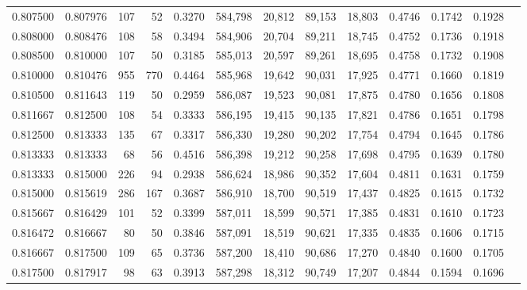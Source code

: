 \begin{tabular}{rrrrrrrrrrrrr}
0.807500 & 0.807976 &   107 &  52 &                                     0.3270 & 584,798 &  20,812 &  89,153 &  18,803 & 0.4746 & 0.1742 & 0.1928 \\
0.808000 & 0.808476 &   108 &  58 &                                     0.3494 & 584,906 &  20,704 &  89,211 &  18,745 & 0.4752 & 0.1736 & 0.1918 \\
0.808500 & 0.810000 &   107 &  50 &                                     0.3185 & 585,013 &  20,597 &  89,261 &  18,695 & 0.4758 & 0.1732 & 0.1908 \\
0.810000 & 0.810476 &   955 & 770 &                                     0.4464 & 585,968 &  19,642 &  90,031 &  17,925 & 0.4771 & 0.1660 & 0.1819 \\
0.810500 & 0.811643 &   119 &  50 &                                     0.2959 & 586,087 &  19,523 &  90,081 &  17,875 & 0.4780 & 0.1656 & 0.1808 \\
0.811667 & 0.812500 &   108 &  54 &                                     0.3333 & 586,195 &  19,415 &  90,135 &  17,821 & 0.4786 & 0.1651 & 0.1798 \\
0.812500 & 0.813333 &   135 &  67 &                                     0.3317 & 586,330 &  19,280 &  90,202 &  17,754 & 0.4794 & 0.1645 & 0.1786 \\
0.813333 & 0.813333 &    68 &  56 &                                     0.4516 & 586,398 &  19,212 &  90,258 &  17,698 & 0.4795 & 0.1639 & 0.1780 \\
0.813333 & 0.815000 &   226 &  94 &                                     0.2938 & 586,624 &  18,986 &  90,352 &  17,604 & 0.4811 & 0.1631 & 0.1759 \\
0.815000 & 0.815619 &   286 & 167 &                                     0.3687 & 586,910 &  18,700 &  90,519 &  17,437 & 0.4825 & 0.1615 & 0.1732 \\
0.815667 & 0.816429 &   101 &  52 &                                     0.3399 & 587,011 &  18,599 &  90,571 &  17,385 & 0.4831 & 0.1610 & 0.1723 \\
0.816472 & 0.816667 &    80 &  50 &                                     0.3846 & 587,091 &  18,519 &  90,621 &  17,335 & 0.4835 & 0.1606 & 0.1715 \\
0.816667 & 0.817500 &   109 &  65 &                                     0.3736 & 587,200 &  18,410 &  90,686 &  17,270 & 0.4840 & 0.1600 & 0.1705 \\
0.817500 & 0.817917 &    98 &  63 &                                     0.3913 & 587,298 &  18,312 &  90,749 &  17,207 & 0.4844 & 0.1594 & 0.1696 \\

\end{tabular}
